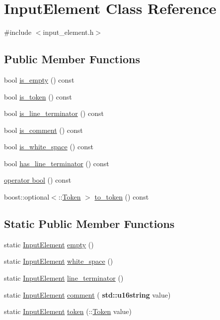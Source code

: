 \hypertarget{class_input_element}{}\section{Input\+Element Class Reference}
\label{class_input_element}


{\ttfamily \#include $<$input\+\_\+element.\+h$>$}

\subsection*{Public Member Functions}
\begin{DoxyCompactItemize}
\item 
bool \hyperlink{class_input_element_a4e4b6b2005fe0b8d07f30ef27210a51b}{is\+\_\+empty} () const
\item 
bool \hyperlink{class_input_element_a6bac1905f5d9aa43f89e1bbfdb553c15}{is\+\_\+token} () const
\item 
bool \hyperlink{class_input_element_adef5e449a8107adaac4f570994d698b9}{is\+\_\+line\+\_\+terminator} () const
\item 
bool \hyperlink{class_input_element_a1e2afc5eda150e298c2341e80798fddd}{is\+\_\+comment} () const
\item 
bool \hyperlink{class_input_element_af9fdf1da0079e858a7a6ad0b5e68d2be}{is\+\_\+white\+\_\+space} () const
\item 
bool \hyperlink{class_input_element_aba40c84ff7da5ede181b2109778fb02c}{has\+\_\+line\+\_\+terminator} () const
\item 
\hyperlink{class_input_element_af7bde3d94430ad92b13ffc395e36bb05}{operator bool} () const
\item 
boost\+::optional$<$\+::\hyperlink{class_token}{Token} $>$ \hyperlink{class_input_element_a906f0cb8a60079177f6d4782c8059a56}{to\+\_\+token} () const
\end{DoxyCompactItemize}
\subsection*{Static Public Member Functions}
\begin{DoxyCompactItemize}
\item 
static \hyperlink{class_input_element}{Input\+Element} \hyperlink{class_input_element_aa6f769b2be5ea1b25e5cdb37235e23c9}{empty} ()
\item 
static \hyperlink{class_input_element}{Input\+Element} \hyperlink{class_input_element_a06304c0e0c45b213946409300d3fa29b}{white\+\_\+space} ()
\item 
static \hyperlink{class_input_element}{Input\+Element} \hyperlink{class_input_element_ae640c23f2603ce464f32bd57c5595656}{line\+\_\+terminator} ()
\item 
static \hyperlink{class_input_element}{Input\+Element} \hyperlink{class_input_element_a8a42a85aa10d7f3b40ea662402880a5a}{comment} (\textbf{ std\+::u16string} value)
\item 
static \hyperlink{class_input_element}{Input\+Element} \hyperlink{class_input_element_a6ecb5790fd45cd8f8492fa8b4011b817}{token} (\+::\hyperlink{class_token}{Token} value)
\end{DoxyCompactItemize}


